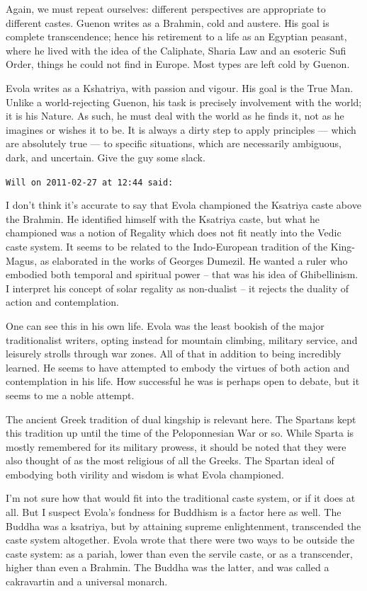 \begin{footnotesize}
\begin{sffamily}
Again, we must repeat ourselves: different perspectives are appropriate to different castes. Guenon writes as a Brahmin, cold and austere. His goal is complete transcendence; hence his retirement to a life as an Egyptian peasant, where he lived with the idea of the Caliphate, Sharia Law and an esoteric Sufi Order, things he could not find in Europe. Most types are left cold by Guenon.

Evola writes as a Kshatriya, with passion and vigour. His goal is the True Man. Unlike a world-rejecting Guenon, his task is precisely involvement with the world; it is his Nature. As such, he must deal with the world as he finds it, not as he imagines or wishes it to be. It is always a dirty step to apply principles --- which are absolutely true --- to specific situations, which are necessarily ambiguous, dark, and uncertain. Give the guy some slack.

\hfill

\texttt{Will on 2011-02-27 at 12:44 said:}

I don't think it's accurate to say that Evola championed the Ksatriya caste above the Brahmin. He identified himself with the Ksatriya caste, but what he championed was a notion of Regality which does not fit neatly into the Vedic caste system. It seems to be related to the Indo-European tradition of the King-Magus, as elaborated in the works of Georges Dumezil. He wanted a ruler who embodied both temporal and spiritual power -- that was his idea of Ghibellinism. I interpret his concept of solar regality as non-dualist -- it rejects the duality of action and contemplation.

One can see this in his own life. Evola was the least bookish of the major traditionalist writers, opting instead for mountain climbing, military service, and leisurely strolls through war zones. All of that in addition to being incredibly learned. He seems to have attempted to embody the virtues of both action and contemplation in his life. How successful he was is perhaps open to debate, but it seems to me a noble attempt.

The ancient Greek tradition of dual kingship is relevant here. The Spartans kept this tradition up until the time of the Peloponnesian War or so. While Sparta is mostly remembered for its military prowess, it should be noted that they were also thought of as the most religious of all the Greeks. The Spartan ideal of embodying both virility and wisdom is what Evola championed.

I'm not sure how that would fit into the traditional caste system, or if it does at all. But I suspect Evola's fondness for Buddhism is a factor here as well. The Buddha was a ksatriya, but by attaining supreme enlightenment, transcended the caste system altogether. Evola wrote that there were two ways to be outside the caste system: as a pariah, lower than even the servile caste, or as a transcender, higher than even a Brahmin. The Buddha was the latter, and was called a cakravartin and a universal monarch.


\end{sffamily}
\end{footnotesize}
